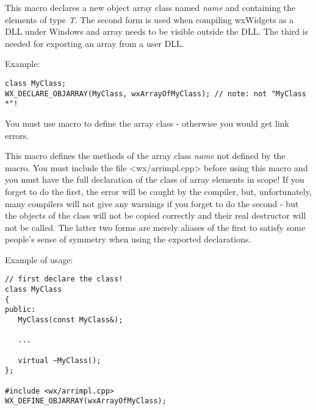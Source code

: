 \label{wxdeclareobjarray}




This macro declares a new object array class named {\it name} and containing
the elements of type {\it T}. The second form is used when compiling wxWidgets as
a DLL under Windows and array needs to be visible outside the DLL.  The third is
needed for exporting an array from a user DLL.

Example:

\begin{verbatim}
class MyClass;
WX_DECLARE_OBJARRAY(MyClass, wxArrayOfMyClass); // note: not "MyClass *"!
\end{verbatim}

You must use  macro to define
the array class - otherwise you would get link errors.

\label{wxdefineobjarray}




This macro defines the methods of the array class {\it name} not defined by the
 macro. You must include the
file <wx/arrimpl.cpp> before using this macro and you must have the full
declaration of the class of array elements in scope! If you forget to do the
first, the error will be caught by the compiler, but, unfortunately, many
compilers will not give any warnings if you forget to do the second - but the
objects of the class will not be copied correctly and their real destructor will
not be called.  The latter two forms are merely aliases of the first to satisfy
some people's sense of symmetry when using the exported declarations.

Example of usage:

\begin{verbatim}
// first declare the class!
class MyClass
{
public:
   MyClass(const MyClass&);

   ...

   virtual ~MyClass();
};

#include <wx/arrimpl.cpp>
WX_DEFINE_OBJARRAY(wxArrayOfMyClass);
\end{verbatim}

